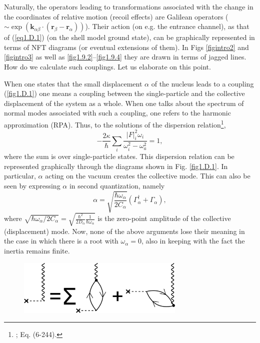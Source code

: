 \begin{subappendices}
Naturally, the operators leading to transformations associated with the change in the coordinates of relative motion (recoil effects) are Galilean operators ($\sim\exp\left(\mathbf k_{\alpha\beta}\cdot(\mathbf r_\beta-\mathbf{r}_\alpha)\right)$). Their action (on e.g. the entrance channel), as that of (\ref{eq1.D.1}) (on the shell model ground state), can be graphically represented in terms of NFT diagrams (or eventual extensions of them). In Figs \ref{figintro2} and \ref{figintro3} as well as \ref{fig1.9.2}--\ref{fig1.9.4}  they are drawn in terms of jagged lines. How do we calculate such couplings. Let us elaborate  on this point.


When one states that the small displacement 
$\alpha$ of the nucleus leads to a coupling (\ref{fig1.D.1}) one means a coupling between the
single-particle and the collective displacement of the system as a whole. When one talks about the spectrum of normal modes 
associated  with such a coupling, one refers to the harmonic approximation (RPA). Thus, to the solutions of the dispersion relation\footnote{\cite{Bohr:75}; Eq. (6-244).},
\begin{equation}\label{eq1.D.5x}
- \frac{2 \kappa}{\hbar} \sum_i \frac{|F|_i^2 \omega_i}{\omega_i^2 - \omega_a^2} = 1,
\end{equation}
where the sum is over  single-particle states. This dispersion relation can be represented graphically 
through the diagrams shown in Fig. \ref{fig1.D.1}. In particular, 
$\alpha$ acting on the vacuum creates the collective mode. This can also be seen by expressing $\alpha$ in second quantization, namely
\begin{equation}
\alpha = \sqrt { \frac{\hbar \omega_{\alpha}}{2C_{\alpha}} }
 (\Gamma_{\alpha}^{\dagger} + \Gamma_{\alpha}),
  \end{equation}
  where $\sqrt{ \hbar \omega_{\alpha}/2 C_{\alpha}} = \sqrt{\frac{\hbar^2}{2D_{\alpha} }\frac{1}{\hbar \omega_{\alpha}}}$ is the zero-point amplitude
of the collective (displacement) mode. 
Now, none of the above arguments lose their meaning  in the case in which there is a root with $\omega_{\alpha}= 0$, 
also in keeping  with the fact the  inertia remains finite. 
               \begin{figure}
               \centerline {
               \includegraphics*[width=8cm]{introduccion/figs/fig1D1}
}
\end{figure}
\end{subappendices}
